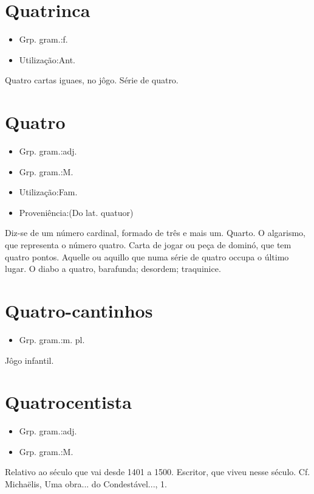 \section{Quatrinca}
\begin{itemize}
\item {Grp. gram.:f.}
\end{itemize}
\begin{itemize}
\item {Utilização:Ant.}
\end{itemize}
Quatro cartas iguaes, no jôgo.
Série de quatro.
\section{Quatro}
\begin{itemize}
\item {Grp. gram.:adj.}
\end{itemize}
\begin{itemize}
\item {Grp. gram.:M.}
\end{itemize}
\begin{itemize}
\item {Utilização:Fam.}
\end{itemize}
\begin{itemize}
\item {Proveniência:(Do lat. \textunderscore quatuor\textunderscore )}
\end{itemize}
Diz-se de um número cardinal, formado de três e mais um.
Quarto.
O algarismo, que representa o número quatro.
Carta de jogar ou peça de dominó, que tem quatro pontos.
Aquelle ou aquillo que numa série de quatro occupa o último lugar.
\textunderscore O diabo a quatro\textunderscore , barafunda; desordem; traquinice.
\section{Quatro-cantinhos}
\begin{itemize}
\item {Grp. gram.:m. pl.}
\end{itemize}
Jôgo infantil.
\section{Quatrocentista}
\begin{itemize}
\item {Grp. gram.:adj.}
\end{itemize}
\begin{itemize}
\item {Grp. gram.:M.}
\end{itemize}
Relativo ao século que vai desde 1401 a 1500.
Escritor, que viveu nesse século. Cf. Michaëlis, \textunderscore Uma obra... do Condestável...\textunderscore , 1.
